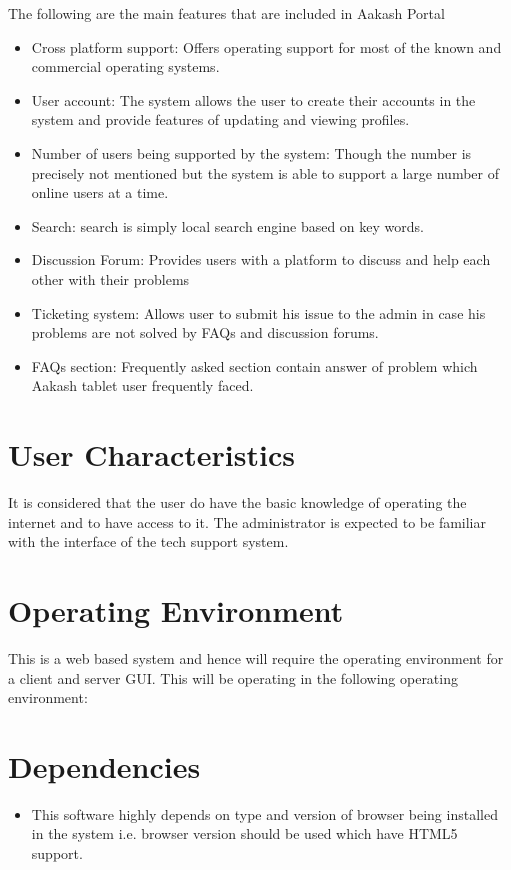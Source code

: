 \documentclass[letterpaper,10pt,english]{sphinxmanual}
\begin{document}
The following are the main features that are included in Aakash Portal
\begin{itemize}
\item {} 
Cross platform support: Offers operating support for most of the known and commercial operating systems.

\item {} 
User account: The system allows the user to create their accounts in the system and provide features of updating and viewing profiles.

\item {} 
Number of users being supported by the system: Though the number is precisely not mentioned but the system is able to support a large number of online users at a time.

\item {} 
Search: search is simply local search engine based on key words.

\item {} 
Discussion Forum: Provides users with a platform to discuss and help each other with their problems

\item {} 
Ticketing system: Allows user to submit his issue to the admin in case his problems are not solved by FAQs and discussion forums.

\item {} 
FAQs section: Frequently asked section contain answer of problem which Aakash tablet user frequently faced.

\end{itemize}


\section{User Characteristics}
\label{prodpersp:user-characteristics}
It is considered that the user do have the basic knowledge of operating the internet and to have access to it. The administrator is expected to be familiar with the interface of the tech support system.


\section{Operating Environment}
\label{prodpersp:operating-environment}
This is a web based system and hence will require the operating environment for a client and server GUI. This will be operating in the following operating environment:


\section{Dependencies}
\label{prodpersp:dependencies}\begin{itemize}
\item {} 
This software highly depends on type and version of browser being installed in the system i.e. browser version should be used which have HTML5 support.

\end{itemize}
\end{document}
